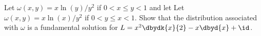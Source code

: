 Let $\omega(x,y)=x\ln(y)/y^2$ if $0<x\leq y<1$ and let Let
$\omega(x,y)=x\ln(x)/y^2$ if $0<y\leq x<1$. Show that the distribution
associated with $\omega$ is a fundamental solution for
$L=x^2\dbydk{x}{2}-x\dbyd{x}+\id$.
